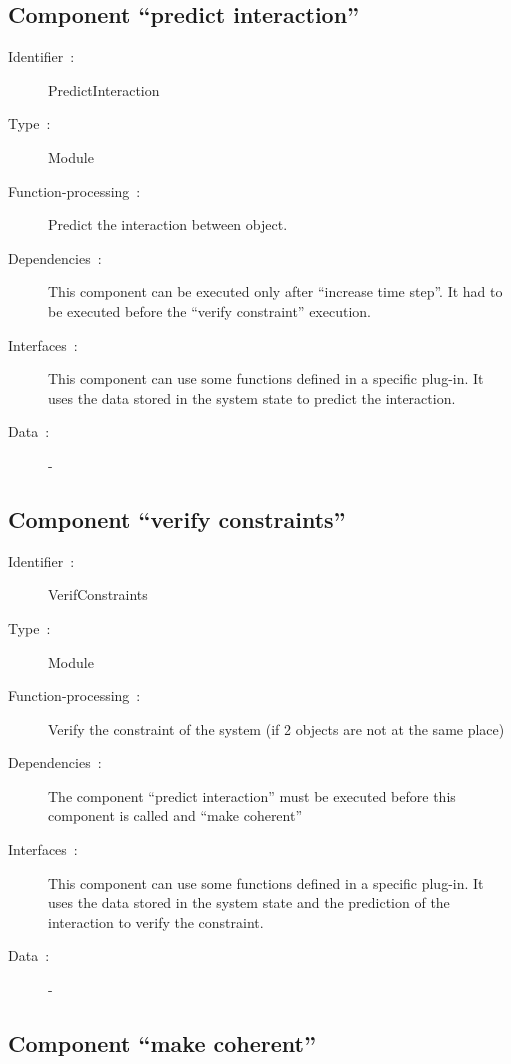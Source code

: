 	
  	\subsection{Component ``predict interaction''}
	
		\begin{description}
	
		\item[Identifier~:]PredictInteraction
		\item[Type~:]Module
		\item[Function-processing~:]Predict the interaction between object.
		\item[Dependencies~:]This component can be executed only after ``increase time step''. It had to be executed before the ``verify constraint'' execution.
		\item[Interfaces~:]This component can use some functions defined in a specific plug-in. It uses the data stored in the system state to predict the interaction. 
		\item[Data~:]-

		\end{description}
	
  	\subsection{Component ``verify constraints''}
	
		\begin{description}
		
		\item[Identifier~:]VerifConstraints
		\item[Type~:]Module
		\item[Function-processing~:]Verify the constraint of the system (if 2 objects are not at the same place)
		\item[Dependencies~:]The component ``predict interaction'' must be executed before this component is called and ``make coherent'' 
		\item[Interfaces~:]This component can use some functions defined in a specific plug-in. It uses the data stored in the system state and the prediction of the interaction to verify the constraint.
		\item[Data~:]-

		\end{description}
	
  	\subsection{Component ``make coherent''}
	
